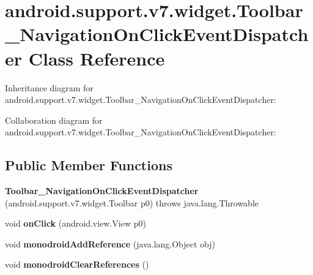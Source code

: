\hypertarget{classandroid_1_1support_1_1v7_1_1widget_1_1_toolbar___navigation_on_click_event_dispatcher}{}\section{android.\+support.\+v7.\+widget.\+Toolbar\+\_\+\+Navigation\+On\+Click\+Event\+Dispatcher Class Reference}
\label{classandroid_1_1support_1_1v7_1_1widget_1_1_toolbar___navigation_on_click_event_dispatcher}


Inheritance diagram for android.\+support.\+v7.\+widget.\+Toolbar\+\_\+\+Navigation\+On\+Click\+Event\+Dispatcher\+:


Collaboration diagram for android.\+support.\+v7.\+widget.\+Toolbar\+\_\+\+Navigation\+On\+Click\+Event\+Dispatcher\+:
\subsection*{Public Member Functions}
\begin{DoxyCompactItemize}
\item 
\mbox{\label{classandroid_1_1support_1_1v7_1_1widget_1_1_toolbar___navigation_on_click_event_dispatcher_a0c1d66856f34b4dcbc6387abdebd3c72}} 
{\bfseries Toolbar\+\_\+\+Navigation\+On\+Click\+Event\+Dispatcher} (android.\+support.\+v7.\+widget.\+Toolbar p0)  throws java.\+lang.\+Throwable 	
\item 
\mbox{\label{classandroid_1_1support_1_1v7_1_1widget_1_1_toolbar___navigation_on_click_event_dispatcher_a59518f53b2c1df0102f4833a6260d5dc}} 
void {\bfseries on\+Click} (android.\+view.\+View p0)
\item 
\mbox{\label{classandroid_1_1support_1_1v7_1_1widget_1_1_toolbar___navigation_on_click_event_dispatcher_af7f274e66fb83d380643feda03368bbb}} 
void {\bfseries monodroid\+Add\+Reference} (java.\+lang.\+Object obj)
\item 
\mbox{\label{classandroid_1_1support_1_1v7_1_1widget_1_1_toolbar___navigation_on_click_event_dispatcher_ae35f48770412dbae3caf5ebef20a26f9}} 
void {\bfseries monodroid\+Clear\+References} ()
\end{DoxyCompactItemize}
